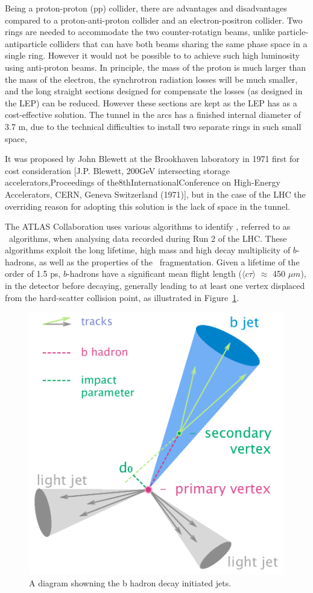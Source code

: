\documentclass[letterpaper,12pt]{article}
\begin{document}
	Being a proton-proton (pp) collider, there are advantages and disadvantages compared to a
	proton-anti-proton collider and an electron-positron collider. 
	Two rings are needed to accommodate the two counter-rotatign beams, unlike particle-antiparticle 
	colliders that can have both beams sharing the same phase space in a single ring.
	However it would not be possible to to achieve such high luminosity using
	anti-proton beams. 
	In principle, the mass of the proton is much larger than the mass of the electron, the
	synchrotron radiation losses will be much smaller, and the long straight sections designed for
	compensate the losses (as designed in the LEP) can be reduced. However these sections are kept 
	as the LEP has as a cost-effective solution. 
	The tunnel in the arcs has a finished internal diameter of 3.7 m, 
	due to the technical difficulties to install two separate rings in such small space,
	
	It was proposed by John Blewett at the Brookhaven laboratory in 1971 first for
	cost consideration [J.P. Blewett, 200GeV intersecting storage accelerators,Proceedings of the8thInternationalConference on High-Energy Accelerators, CERN, Geneva Switzerland (1971)],
	but in the case of the LHC the overriding reason for adopting this solution
	is the lack of space in the tunnel. 
    
    
The ATLAS Collaboration uses various algorithms to identify 
\bjets \cite{PERF-2012-04}, referred to as \btagging\ algorithms, 
when analysing data recorded during Run 2 of the LHC. These 
algorithms exploit the long lifetime, high mass and high decay 
multiplicity of $b$-hadrons, as well as the properties of the \bquark\  
fragmentation. Given a lifetime of the order of 1.5 ps, $b$-hadrons have a 
significant mean flight length ($\langle c\tau \rangle$ $\approx$ 450 $\mu m$), 
in the detector before decaying, generally leading to at least one vertex 
displaced from the hard-scatter collision point, as illustrated in Figure~\ref{fig:b-jet-decay}.

\begin{figure}[]
	\begin{centering}	
	\includegraphics[width=.4\textwidth]{FTAG_plots/B-tagging_diagram.png}
	\caption{A diagram showning the b hadron decay initiated jets. }
	\label{fig:b-jet-decay}
	\end{centering}
\end{figure}
\end{document}

